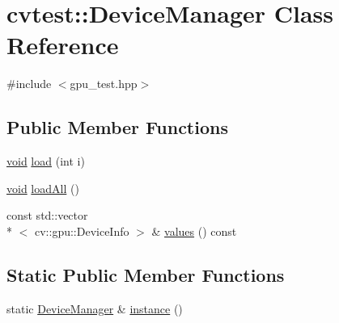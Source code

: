 \hypertarget{classcvtest_1_1DeviceManager}{\section{cvtest\-:\-:Device\-Manager Class Reference}
\label{classcvtest_1_1DeviceManager}
}


{\ttfamily \#include $<$gpu\-\_\-test.\-hpp$>$}

\subsection*{Public Member Functions}
\begin{DoxyCompactItemize}
\item 
\hyperlink{legacy_8hpp_a8bb47f092d473522721002c86c13b94e}{void} \hyperlink{classcvtest_1_1DeviceManager_aa4573e6ab575a4430d599894980b4ac3}{load} (int i)
\item 
\hyperlink{legacy_8hpp_a8bb47f092d473522721002c86c13b94e}{void} \hyperlink{classcvtest_1_1DeviceManager_ad5e528d001be36505391127de13f8ffb}{load\-All} ()
\item 
const std\-::vector\\*
$<$ cv\-::gpu\-::\-Device\-Info $>$ \& \hyperlink{classcvtest_1_1DeviceManager_ad8bd0b1d36530844f7e99265e778c71b}{values} () const 
\end{DoxyCompactItemize}
\subsection*{Static Public Member Functions}
\begin{DoxyCompactItemize}
\item 
static \hyperlink{classcvtest_1_1DeviceManager}{Device\-Manager} \& \hyperlink{classcvtest_1_1DeviceManager_ad41798648f87ee394568d84099b9e873}{instance} ()
\end{DoxyCompactItemize}



